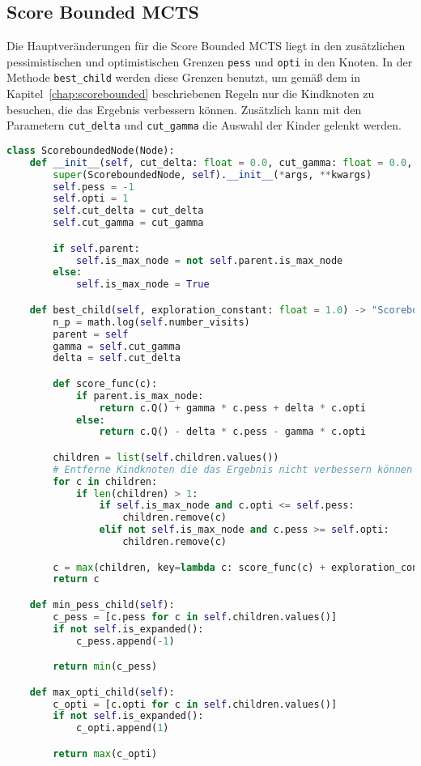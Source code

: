 \subsection{Score Bounded MCTS}

Die Hauptveränderungen für die Score Bounded MCTS liegt in den zusätzlichen pessimistischen und optimistischen Grenzen \verb|pess| und \verb|opti| in den Knoten.
In der Methode \verb|best_child| werden diese Grenzen benutzt, um gemäß dem in Kapitel~\ref{chap:scorebounded} beschriebenen Regeln nur die Kindknoten zu besuchen, die das Ergebnis verbessern können.
Zusätzlich kann mit den Parametern \verb|cut_delta| und \verb|cut_gamma| die Auswahl der Kinder gelenkt werden.

\begin{lstlisting}[language=Python,label={lst:scorebounded-node}]
class ScoreboundedNode(Node):
    def __init__(self, cut_delta: float = 0.0, cut_gamma: float = 0.0, *args, **kwargs):
        super(ScoreboundedNode, self).__init__(*args, **kwargs)
        self.pess = -1
        self.opti = 1
        self.cut_delta = cut_delta
        self.cut_gamma = cut_gamma

        if self.parent:
            self.is_max_node = not self.parent.is_max_node
        else:
            self.is_max_node = True

    def best_child(self, exploration_constant: float = 1.0) -> "ScoreboundedNode":
        n_p = math.log(self.number_visits)
        parent = self
        gamma = self.cut_gamma
        delta = self.cut_delta

        def score_func(c):
            if parent.is_max_node:
                return c.Q() + gamma * c.pess + delta * c.opti
            else:
                return c.Q() - delta * c.pess - gamma * c.opti

        children = list(self.children.values())
        # Entferne Kindknoten die das Ergebnis nicht verbessern können
        for c in children:
            if len(children) > 1:
                if self.is_max_node and c.opti <= self.pess:
                    children.remove(c)
                elif not self.is_max_node and c.pess >= self.opti:
                    children.remove(c)

        c = max(children, key=lambda c: score_func(c) + exploration_constant * math.sqrt(n_p / c.number_visits))
        return c

    def min_pess_child(self):
        c_pess = [c.pess for c in self.children.values()]
        if not self.is_expanded():
            c_pess.append(-1)

        return min(c_pess)

    def max_opti_child(self):
        c_opti = [c.opti for c in self.children.values()]
        if not self.is_expanded():
            c_opti.append(1)

        return max(c_opti)
\end{lstlisting}

